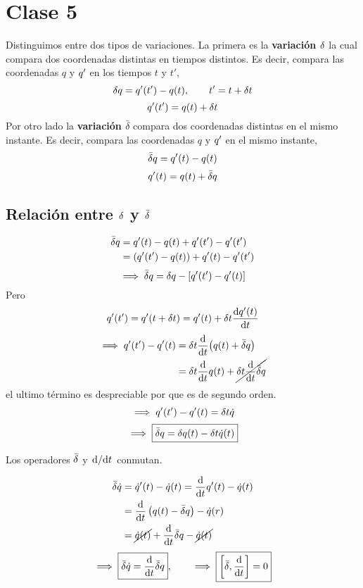 \section{Clase 5}\label{clase:5}
Distinguimos entre dos tipos de variaciones. La primera es la \textbf{variación $\delta$} la cual compara dos coordenadas distintas en tiempos distintos. Es decir, compara las coordenadas $q$ y $q'$ en los tiempos $t$ y $t'$,
\begin{equation}
  \delta q=q'(t')-q(t),\qquad t'=t+\delta t
\end{equation}
\begin{equation}
  q'(t')=q(t)+\delta t
\end{equation}
Por otro lado la \textbf{variación $\bar{\delta}$} compara dos coordenadas distintas en el mismo instante. Es decir, compara las coordenadas $q$ y $q'$ en el mismo instante,
\begin{equation}
  \bar{\delta} q=q'(t)-q(t)
\end{equation}
\begin{equation}
  q'(t)=q(t)+\bar{\delta} q
\end{equation}
\subsection{Relación entre $\delta$ y $\bar{\delta}$}
\begin{align}
  \bar{\delta} q&=q'(t)-q(t)+q'(t')-q'(t')\\
  &=(q'(t')-q(t))+q'(t)-q'(t')
\end{align}
\begin{equation}\label{5.1.1}
  \implies \bar{\delta} q=\delta q-[q'(t')-q'(t)]
\end{equation}
Pero
\begin{equation}
  q'(t')=q'(t+\delta t)=q'(t)+\delta t\dv{q'(t)}{t}
\end{equation}
\begin{align}
  \implies q'(t')-q'(t)&=\delta t\dv{t}(q(t)+\bar{\delta} q)\\
  &=\delta t\dv{t}q(t)+\cancel{\delta t\dv{t}\bar{\delta} q}
\end{align}
el ultimo término es despreciable por que es de segundo orden.
\begin{equation}
  \implies q'(t')-q'(t)=\delta t\dot{q}
\end{equation}
\begin{equation}
  \implies\boxed{ \bar{\delta} q=\delta q(t)-\delta t\dot{q}(t)}
\end{equation}

\begin{prop}
	Los operadores $\bar{\delta}$ y $\dv*{t}$ conmutan.
\end{prop}
\begin{align}
  \bar{\delta} \dot{q}&=\dot{q}'(t)-\dot{q}(t)=\dv{t}q'(t)-\dot{q}(t)\\
  &=\dv{t}\left(q(t)-\bar{\delta} q\right)-\dot{q}(r)\\
  &=\cancel{\dot{q}(t)}+\dv{t}\bar{\delta} q-\cancel{\dot{q}(t)}
\end{align}
\begin{equation}
  \implies \boxed{\bar{\delta}\dot{q}=\dv{t}\bar{\delta} q},\qquad\implies  \boxed{\left[\bar{\delta},\dv{t}\right]=0}
\end{equation}

